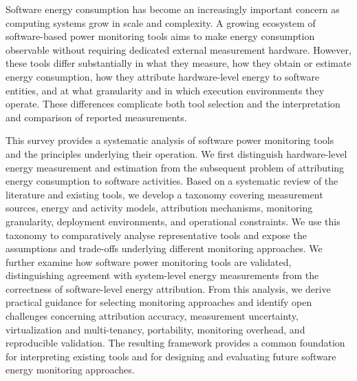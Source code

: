 Software energy consumption has become an increasingly important concern as
computing systems grow in scale and complexity. A growing ecosystem of
software-based power monitoring tools aims to make energy consumption
observable without requiring dedicated external measurement hardware.
However, these tools differ substantially in what they measure, how they
obtain or estimate energy consumption, how they attribute hardware-level
energy to software entities, and at what granularity and in which execution
environments they operate. These differences complicate both tool selection
and the interpretation and comparison of reported measurements.

This survey provides a systematic analysis of software power monitoring
tools and the principles underlying their operation. We first distinguish
hardware-level energy measurement and estimation from the subsequent
problem of attributing energy consumption to software activities. Based on
a systematic review of the literature and existing tools, we develop a
taxonomy covering measurement sources, energy and activity models,
attribution mechanisms, monitoring granularity, deployment environments,
and operational constraints. We use this taxonomy to comparatively analyse
representative tools and expose the assumptions and trade-offs underlying
different monitoring approaches. We further examine how software power
monitoring tools are validated, distinguishing agreement with system-level
energy measurements from the correctness of software-level energy
attribution. From this analysis, we derive practical guidance for selecting
monitoring approaches and identify open challenges concerning attribution
accuracy, measurement uncertainty, virtualization and multi-tenancy,
portability, monitoring overhead, and reproducible validation. The
resulting framework provides a common foundation for interpreting existing
tools and for designing and evaluating future software energy monitoring
approaches.

